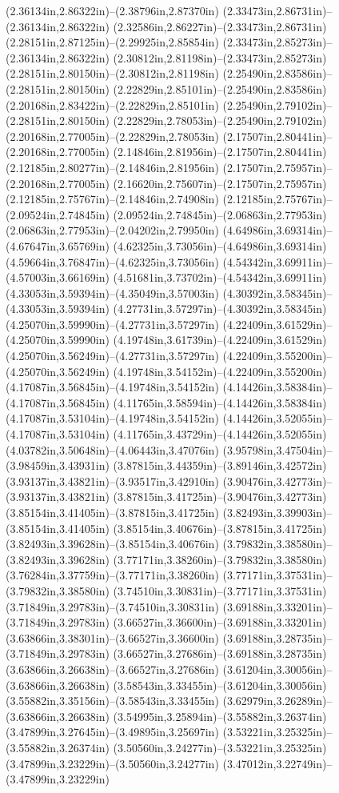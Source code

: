 (2.36134in,2.86322in)--(2.38796in,2.87370in) (2.33473in,2.86731in)--(2.36134in,2.86322in) (2.32586in,2.86227in)--(2.33473in,2.86731in) (2.28151in,2.87125in)--(2.29925in,2.85854in) (2.33473in,2.85273in)--(2.36134in,2.86322in) (2.30812in,2.81198in)--(2.33473in,2.85273in) (2.28151in,2.80150in)--(2.30812in,2.81198in) (2.25490in,2.83586in)--(2.28151in,2.80150in) (2.22829in,2.85101in)--(2.25490in,2.83586in) (2.20168in,2.83422in)--(2.22829in,2.85101in) (2.25490in,2.79102in)--(2.28151in,2.80150in) (2.22829in,2.78053in)--(2.25490in,2.79102in) (2.20168in,2.77005in)--(2.22829in,2.78053in) (2.17507in,2.80441in)--(2.20168in,2.77005in) (2.14846in,2.81956in)--(2.17507in,2.80441in) (2.12185in,2.80277in)--(2.14846in,2.81956in) (2.17507in,2.75957in)--(2.20168in,2.77005in) (2.16620in,2.75607in)--(2.17507in,2.75957in) (2.12185in,2.75767in)--(2.14846in,2.74908in) (2.12185in,2.75767in)--(2.09524in,2.74845in) (2.09524in,2.74845in)--(2.06863in,2.77953in) (2.06863in,2.77953in)--(2.04202in,2.79950in) (4.64986in,3.69314in)--(4.67647in,3.65769in) (4.62325in,3.73056in)--(4.64986in,3.69314in) (4.59664in,3.76847in)--(4.62325in,3.73056in) (4.54342in,3.69911in)--(4.57003in,3.66169in) (4.51681in,3.73702in)--(4.54342in,3.69911in) (4.33053in,3.59394in)--(4.35049in,3.57003in) (4.30392in,3.58345in)--(4.33053in,3.59394in) (4.27731in,3.57297in)--(4.30392in,3.58345in) (4.25070in,3.59990in)--(4.27731in,3.57297in) (4.22409in,3.61529in)--(4.25070in,3.59990in) (4.19748in,3.61739in)--(4.22409in,3.61529in) (4.25070in,3.56249in)--(4.27731in,3.57297in) (4.22409in,3.55200in)--(4.25070in,3.56249in) (4.19748in,3.54152in)--(4.22409in,3.55200in) (4.17087in,3.56845in)--(4.19748in,3.54152in) (4.14426in,3.58384in)--(4.17087in,3.56845in) (4.11765in,3.58594in)--(4.14426in,3.58384in) (4.17087in,3.53104in)--(4.19748in,3.54152in) (4.14426in,3.52055in)--(4.17087in,3.53104in) (4.11765in,3.43729in)--(4.14426in,3.52055in) (4.03782in,3.50648in)--(4.06443in,3.47076in) (3.95798in,3.47504in)--(3.98459in,3.43931in) (3.87815in,3.44359in)--(3.89146in,3.42572in) (3.93137in,3.43821in)--(3.93517in,3.42910in) (3.90476in,3.42773in)--(3.93137in,3.43821in) (3.87815in,3.41725in)--(3.90476in,3.42773in) (3.85154in,3.41405in)--(3.87815in,3.41725in) (3.82493in,3.39903in)--(3.85154in,3.41405in) (3.85154in,3.40676in)--(3.87815in,3.41725in) (3.82493in,3.39628in)--(3.85154in,3.40676in) (3.79832in,3.38580in)--(3.82493in,3.39628in) (3.77171in,3.38260in)--(3.79832in,3.38580in) (3.76284in,3.37759in)--(3.77171in,3.38260in) (3.77171in,3.37531in)--(3.79832in,3.38580in) (3.74510in,3.30831in)--(3.77171in,3.37531in) (3.71849in,3.29783in)--(3.74510in,3.30831in) (3.69188in,3.33201in)--(3.71849in,3.29783in) (3.66527in,3.36600in)--(3.69188in,3.33201in) (3.63866in,3.38301in)--(3.66527in,3.36600in) (3.69188in,3.28735in)--(3.71849in,3.29783in) (3.66527in,3.27686in)--(3.69188in,3.28735in) (3.63866in,3.26638in)--(3.66527in,3.27686in) (3.61204in,3.30056in)--(3.63866in,3.26638in) (3.58543in,3.33455in)--(3.61204in,3.30056in) (3.55882in,3.35156in)--(3.58543in,3.33455in) (3.62979in,3.26289in)--(3.63866in,3.26638in) (3.54995in,3.25894in)--(3.55882in,3.26374in) (3.47899in,3.27645in)--(3.49895in,3.25697in) (3.53221in,3.25325in)--(3.55882in,3.26374in) (3.50560in,3.24277in)--(3.53221in,3.25325in) (3.47899in,3.23229in)--(3.50560in,3.24277in) (3.47012in,3.22749in)--(3.47899in,3.23229in) 
